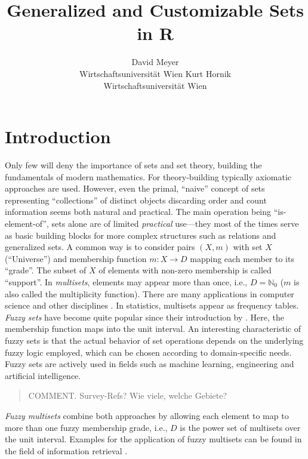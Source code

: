 \documentclass[article]{jss}
\author{David Meyer\\Wirtschaftsuniversit{\"a}t Wien \And
        Kurt Hornik\\Wirtschaftsuniversit{\"a}t Wien}
\title{Generalized and Customizable Sets in {\sf R}}
\newcommand{\comment}[1]{\begin{quote} COMMENT. #1\end{quote}}
\begin{document}

\section[Introduction]{Introduction}

Only few will deny the importance of sets and set theory, building the
fundamentals of modern mathematics. For theory-building typically
axiomatic approaches \citep[e.g.,][]{sets:zermelo:1908, sets:fraenkel:1922}
are used. However, even
the primal, ``naive'' concept of sets representing ``collections''
of distinct objects \citep{sets:cantor:1895} discarding order
and count information seems both natural and practical.
The main operation being ``is-element-of'', sets alone are of limited
\emph{practical} use---they most of the times serve as basic building blocks for
more complex structures such as relations and generalized sets. A
common way is to consider pairs $(X, m)$ with set $X$ (``Universe'')
and membership function
$m : X \rightarrow D$ mapping each member to its ``grade''. The subset
of $X$ of elements with non-zero membership is called ``support''.
In \emph{multisets}, elements may appear more than once, i.e., $D =
\mathbb{N}_0$ ($m$ is also called the multiplicity function). There are many
applications in computer science and other disciplines
\citep[For a survey, see, e.g.,][]{sets:singh+ibrahim+yohanna:2007}.
In statistics, multisets appear as frequency tables. \emph{Fuzzy sets}
have become quite popular since their introduction by
\cite{sets:zadeh:1965}. Here, the membership function maps into the
unit interval. An interesting characteristic of fuzzy sets is that
the actual behavior of set operations depends on the underlying
fuzzy logic employed, which can be chosen according to domain-specific
needs. Fuzzy sets are actively used in fields such as machine
learning, engineering and artificial intelligence.
\comment{Survey-Refs? Wie viele, welche Gebiete?}
\emph{Fuzzy multisets} \citep{sets:yager:1986}
combine both approaches by allowing
each element to map to more than one fuzzy membership grade, i.e., $D$ is
the power set of multisets over the unit interval. Examples for the
application of fuzzy multisets can be found in the field of information
retrieval \citep[e.g.,][]{sets:matthe+caluwe+tre:2006}.
\end{document}
